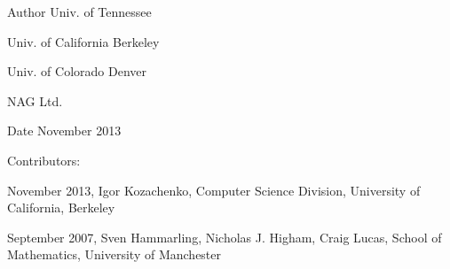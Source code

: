 \begin{DoxyAuthor}{Author}
Univ. of Tennessee 

Univ. of California Berkeley 

Univ. of Colorado Denver 

N\+A\+G Ltd. 
\end{DoxyAuthor}
\begin{DoxyDate}{Date}
November 2013 
\end{DoxyDate}
\begin{DoxyParagraph}{Contributors\+: }

\end{DoxyParagraph}
November 2013, Igor Kozachenko, Computer Science Division, University of California, Berkeley

September 2007, Sven Hammarling, Nicholas J. Higham, Craig Lucas, School of Mathematics, University of Manchester